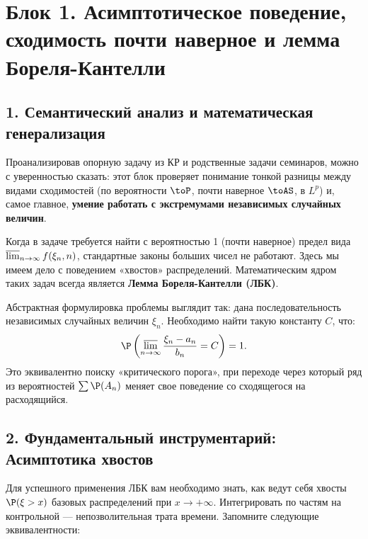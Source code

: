 \section*{Блок 1. Асимптотическое поведение, сходимость почти наверное и лемма Бореля-Кантелли}

\subsection*{1. Семантический анализ и математическая генерализация}

Проанализировав опорную задачу из КР и родственные задачи семинаров, можно с уверенностью сказать: этот блок проверяет понимание тонкой разницы между видами сходимостей (по вероятности $\toP$, почти наверное $\toAS$, в $L^p$) и, самое главное, \textbf{умение работать с экстремумами независимых случайных величин}. 

Когда в задаче требуется найти с вероятностью 1 (почти наверное) предел вида $\varlimsup_{n\to\infty} f(\xi_n, n)$, стандартные законы больших чисел не работают. Здесь мы имеем дело с поведением «хвостов» распределений. Математическим ядром таких задач всегда является \textbf{Лемма Бореля-Кантелли (ЛБК)}.

Абстрактная формулировка проблемы выглядит так: дана последовательность независимых случайных величин $\xi_n$. Необходимо найти такую константу $C$, что:
\[
    \P\left(\varlimsup_{n\to\infty} \frac{\xi_n - a_n}{b_n} = C\right) = 1.
\]
Это эквивалентно поиску «критического порога», при переходе через который ряд из вероятностей $\sum \P(A_n)$ меняет свое поведение со сходящегося на расходящийся.

\subsection*{2. Фундаментальный инструментарий: Асимптотика хвостов}

Для успешного применения ЛБК вам необходимо знать, как ведут себя хвосты $\P(\xi > x)$ базовых распределений при $x \to +\infty$. Интегрировать по частям на контрольной — непозволительная трата времени. Запомните следующие эквивалентности:



